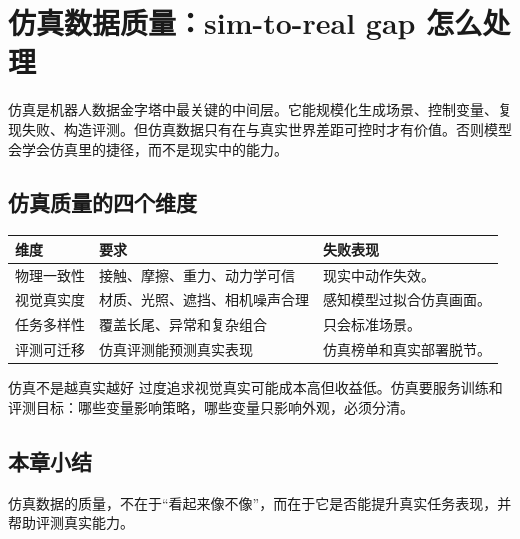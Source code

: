 \section{仿真数据质量：sim-to-real gap 怎么处理}

仿真是机器人数据金字塔中最关键的中间层。它能规模化生成场景、控制变量、复现失败、构造评测。但仿真数据只有在与真实世界差距可控时才有价值。否则模型会学会仿真里的捷径，而不是现实中的能力。

\subsection{仿真质量的四个维度}

\noindent\begin{tabularx}{\textwidth}{p{}p{}X}
\toprule
维度 & 要求 & 失败表现 \\
\midrule
物理一致性 & 接触、摩擦、重力、动力学可信 & 现实中动作失效。 \\
视觉真实度 & 材质、光照、遮挡、相机噪声合理 & 感知模型过拟合仿真画面。 \\
任务多样性 & 覆盖长尾、异常和复杂组合 & 只会标准场景。 \\
评测可迁移 & 仿真评测能预测真实表现 & 仿真榜单和真实部署脱节。 \\
\bottomrule
\end{tabularx}

\begin{warningbox}{仿真不是越真实越好}
过度追求视觉真实可能成本高但收益低。仿真要服务训练和评测目标：哪些变量影响策略，哪些变量只影响外观，必须分清。
\end{warningbox}

\subsection{本章小结}

仿真数据的质量，不在于“看起来像不像”，而在于它是否能提升真实任务表现，并帮助评测真实能力。

